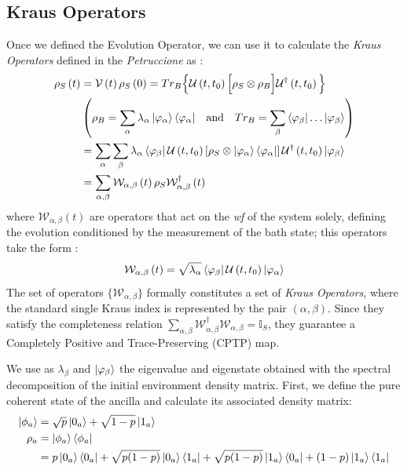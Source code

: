 \documentclass[a4paper,12pt]{article}
\begin{document}
\subsection{Kraus Operators}
Once we defined the Evolution Operator, we can use it to calculate the \textit{Kraus Operators} defined in the \textit{Petruccione} as :
\begin{align}
	\rho_{S} \left(t\right) &= \mathcal{V}\left(t\right) \rho_{S} \left(0\right) = Tr_{B} \Big\{ \mathcal{U}\left(t, t_0\right) \Big[ \rho_{S} \otimes \rho_{B} \Big] \mathcal{U}^{\dagger}\left(t, t_0\right) \Big\} \\
	&\left( \rho_{B} = \sum_{\alpha}{\lambda_{\alpha} \ket{\varphi_{\alpha}} \bra{\varphi_{\alpha}}} \quad \text{and} \quad Tr_{B} = \sum_{\beta}{\bra{\varphi_{\beta}} \dots \ket{\varphi_{\beta}}} \right) \notag \\
	&= \sum_{\alpha}{\sum_{\beta}{\lambda_{\alpha}\bra{\varphi_{\beta}} \mathcal{U}\left(t, t_0\right) \left[ \rho_{S} \otimes \ket{\varphi_{\alpha}} \bra{\varphi_{\alpha}} \right]  \mathcal{U}^{\dagger}\left(t, t_0\right) \ket{\varphi_{\beta}} }} \notag \\
	&= \sum_{\alpha, \beta}{ \mathcal{W}_{\alpha, \beta} \left(t\right) \rho_{S} \mathcal{W}^{\dagger}_{\alpha, \beta} \left(t\right) }
	\label{eq:dynamical_map_kraus_operators}
\end{align}
where $ \mathcal{W}_{\alpha, \beta} \left(t\right) $ are operators that act on the \textit{wf} of the system solely, defining the evolution conditioned by the measurement of the bath state; this operators take the form :
\begin{equation}
	\mathcal{W}_{\alpha, \beta} \left(t\right) = \sqrt{\lambda_{\alpha}} \bra{\varphi_{\beta}}  \mathcal{U}\left(t, t_0\right) \ket{\varphi_{\alpha}}
	\label{eq:general_kraus_operators}
\end{equation}
The set of operators $\{ \mathcal{W}_{\alpha, \beta} \}$ formally constitutes a set of \textit{Kraus Operators}, where the standard single Kraus index is represented by the pair $(\alpha, \beta)$. Since they satisfy the completeness relation $\sum_{\alpha, \beta} \mathcal{W}_{\alpha, \beta}^\dagger \mathcal{W}_{\alpha, \beta} = \mathbb{I}_S$, they guarantee a Completely Positive and Trace-Preserving (CPTP) map.

We use as $ \lambda_{\beta} $ and $ \ket{\varphi_{\beta}} $ the eigenvalue and eigenstate obtained with the spectral decomposition of the initial environment density matrix.
First, we define the pure coherent state of the ancilla and calculate its associated density matrix:
\begin{align}
	\ket{\phi_a} &= \sqrt{p} \ket{0_a} + \sqrt{1-p} \ket{1_a} \\
	\rho_a &= \ket{\phi_a}\bra{\phi_a} \notag \\
	&= p \ket{0_a}\bra{0_a} + \sqrt{p(1-p)} \ket{0_a}\bra{1_a} + \sqrt{p(1-p)} \ket{1_a}\bra{0_a} + (1-p) \ket{1_a}\bra{1_a}
\end{align}
\end{document}
